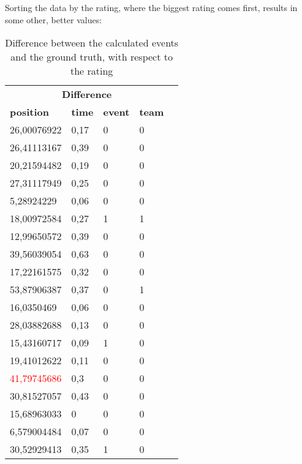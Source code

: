 Sorting the data by the rating, where the biggest rating comes first, results in some other, better values:

\begin{table}[H]
    \begin{center}
		\begin{tabular}{|l|l|l|l|l}
			\hline
            \multicolumn{4}{|c|}{\large \textbf{Difference}} \\
			\hhline{====}
			\textbf{position} & \textbf{time} & \textbf{event} & \textbf{team} \\
			\hline
            26,00076922	& 0,17 & 0 & 0\\
			\hline
            26,41113167 & 0,39 & 0 & 0\\
   			\hline
            20,21594482 & 0,19 & 0 & 0\\
			\hline
            27,31117949 & 0,25 & 0 & 0\\
			\hline
            5,28924229 & 0,06 & 0 & 0\\
			\hline
            18,00972584 & 0,27 & 1 & 1\\
			\hline
            12,99650572 & 0,39 & 0 & 0\\
			\hline
            39,56039054 & 0,63 & 0 & 0\\
			\hline
            17,22161575 & 0,32 & 0 & 0\\
			\hline
            53,87906387 & 0,37 & 0 & 1\\
    			\hline
            16,0350469 & 0,06 & 0 & 0\\
			\hline
            28,03882688 & 0,13 & 0 & 0\\
			\hline
            15,43160717 & 0,09 & 1 & 0\\
			\hline
            19,41012622 & 0,11 & 0 & 0\\
			\hline
            \textcolor{red}{41,79745686} & 0,3 & 0 & 0\\
			\hline
            30,81527057 & 0,43 & 0 & 0\\
			\hline
            15,68963033 & 0 & 0 & 0\\
			\hline
            6,579004484 & 0,07 & 0 & 0\\
			\hline
            30,52929413 & 0,35 & 1 & 0\\
			\hline
		\end{tabular}
    \end{center}
    \caption{Difference between the calculated events and the ground truth, with respect to the rating}
    \label{img:diffGT:second:ordered}
\end{table}


